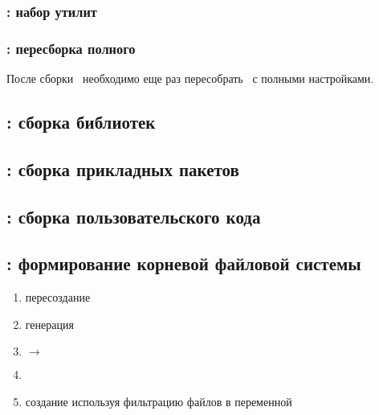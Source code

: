 


\subsubsection{: набор утилит } \label{azbb}


\subsubsection{: пересборка полного } \label{azgcc}

После сборки \ необходимо еще раз пересобрать \ с полными
настройками.

\subsection{: сборка библиотек } \label{azlibs}

\subsection{: сборка прикладных пакетов }
\label{azapps}

\subsection{: сборка пользовательского кода} \label{azuser}

\subsection{: формирование корневой файловой системы} \label{azroot}


\begin{enumerate}
  \item пересоздание 
  \item генерация  
  \item {} $\rightarrow$ 
  \item {}
  \item создание  используя фильтрацию файлов  в переменной 
\end{enumerate}

